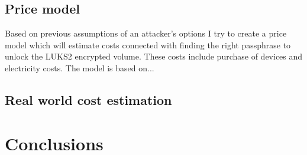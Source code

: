\documentclass[nolof]{fithesis3}
\begin{document}
\section{Price model}
Based on previous assumptions of an attacker's options I try to create a price model which will estimate costs connected with finding the right passphrase to unlock the LUKS2 encrypted volume. These costs include purchase of devices and electricity costs. The model is based on...



\section{Real world cost estimation}



\chapter{Conclusions}

\printbibliography
\end{document}
